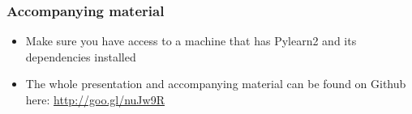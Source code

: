 \documentclass[mathserif, xcolor=dvipsnames]{beamer}
\begin{document}
\begin{frame}
    \frametitle{Accompanying material}
    \begin{itemize}\addtolength{\itemsep}{3.0\baselineskip}
        \item{\Large Make sure you have access to a machine that has Pylearn2
              and its dependencies installed}
        \item{\Large The whole presentation and accompanying material can be
              found on Github here: \url{http://goo.gl/nuJw9R}}
    \end{itemize}
\end{frame}

\end{document}
